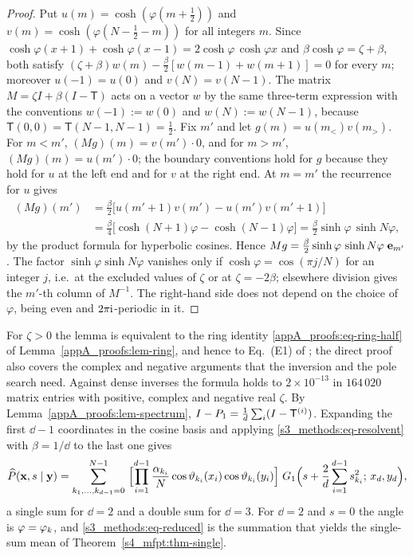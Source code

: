 \begin{proof}
Put $u(m)=\cosh(\varphi(m+\tfrac12))$ and $v(m)=\cosh(\varphi(N-\tfrac12-m))$ for all integers $m$. Since
$\cosh\varphi(x+1)+\cosh\varphi(x-1)=2\cosh\varphi\,\cosh\varphi x$ and $\beta\cosh\varphi=\zeta+\beta$, both satisfy
$(\zeta+\beta)w(m)-\tfrac{\beta}{2}[w(m-1)+w(m+1)]=0$ for every $m$; moreover $u(-1)=u(0)$ and $v(N)=v(N-1)$. The matrix
$M=\zeta I+\beta(I-\mathsf T)$ acts on a vector $w$ by the same three-term expression with the conventions
$w(-1):=w(0)$ and $w(N):=w(N-1)$, because $\mathsf T(0,0)=\mathsf T(N-1,N-1)=\tfrac12$. Fix $m'$ and let
$g(m)=u(m_<)v(m_>)$. For $m<m'$, $(Mg)(m)=v(m')\cdot0$, and for $m>m'$, $(Mg)(m)=u(m')\cdot0$; the boundary
conventions hold for $g$ because they hold for $u$ at the left end and for $v$ at the right end. At $m=m'$ the
recurrence for $u$ gives
\begin{align*}
  (Mg)(m')&=\tfrac{\beta}{2}\bigl[u(m'+1)v(m')-u(m')v(m'+1)\bigr]\\
          &=\tfrac{\beta}{4}\bigl[\cosh(N+1)\varphi-\cosh(N-1)\varphi\bigr]=\tfrac{\beta}{2}\sinh\varphi\,\sinh N\varphi ,
\end{align*}
by the product formula for hyperbolic cosines. Hence $Mg=\tfrac{\beta}{2}\sinh\varphi\,\sinh N\varphi\;\mathbf{e}_{m'}$. The
factor $\sinh\varphi\sinh N\varphi$ vanishes only if $\cosh\varphi=\cos(\pi j/N)$ for an integer $j$, i.e.\ at the
excluded values of $\zeta$ or at $\zeta=-2\beta$; elsewhere division gives the $m'$-th column of $M^{-1}$. The
right-hand side does not depend on the choice of $\varphi$, being even and $2\pi\mathrm{i}$-periodic in it.
\end{proof}

For $\zeta>0$ the lemma is equivalent to the ring identity \eqref{appA_proofs:eq-ring-half} of
Lemma~\ref{appA_proofs:lem-ring}, and hence to Eq.~(E1) of \citet{Giuggioli2020}; the direct proof also covers the
complex and negative arguments that the inversion and the pole search need. Against dense inverses the formula holds
to $2\times10^{-13}$ in $164\,020$ matrix entries with positive, complex and negative real $\zeta$.
By Lemma~\ref{appA_proofs:lem-spectrum}, $I-P_1=\frac1{d}\sum_i(I-\mathsf T^{(i)})$. Expanding the first $\dd-1$
coordinates in the cosine basis and applying \eqref{s3_methods:eq-resolvent} with $\beta=1/\dd$ to the last one gives
\begin{equation}\label{s3_methods:eq-reduced}
  \widehat{P}(\mathbf{x},s\mid\mathbf{y})=\sum_{k_1,\dots,k_{d-1}=0}^{N-1}\
  \Bigl[\prod_{i=1}^{d-1}\frac{\alpha_{k_i}}{N}\cos\vartheta_{k_i}(x_i)\cos\vartheta_{k_i}(y_i)\Bigr]\;
  G_1\Bigl(s+\frac{2}{d}\sum_{i=1}^{d-1}s_{k_i}^{2};\,x_{d},y_{d}\Bigr),
\end{equation}
a single sum for $\dd=2$ and a double sum for $\dd=3$. For $\dd=2$ and $s=0$ the angle is $\varphi=\varphi_{k}$, and
\eqref{s3_methods:eq-reduced} is the summation that yields the single-sum mean of Theorem~\ref{s4_mfpt:thm-single}.

